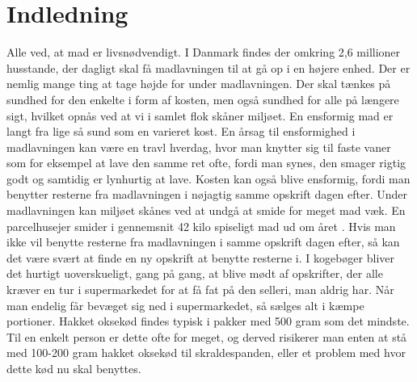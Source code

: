 \chapter{Indledning}
\label{chap:indledning}

Alle ved, at mad er livsnødvendigt. I Danmark findes der omkring 2,6 millioner husstande\cite{husstande}, der dagligt skal få madlavningen til at gå op i en højere enhed. Der er nemlig mange ting at tage højde for under madlavningen. Der skal tænkes på sundhed for den enkelte i form af kosten, men også sundhed for alle på længere sigt, hvilket opnås ved at vi i samlet flok skåner miljøet.
En ensformig mad er langt fra lige så sund som en varieret kost. En årsag til ensformighed i madlavningen kan være en travl hverdag, hvor man knytter sig til faste vaner som for eksempel at lave den samme ret ofte, fordi man synes, den smager rigtig godt og samtidig er lynhurtig at lave. Kosten kan også blive ensformig, fordi man benytter resterne fra madlavningen i nøjagtig samme opskrift dagen efter.
Under madlavningen kan miljøet skånes ved at undgå at smide for meget mad væk. En parcelhusejer smider i gennemsnit 42 kilo spiseligt mad ud om året \cite{madspildpol}. Hvis man ikke vil benytte resterne fra madlavningen i samme opskrift dagen efter, så kan det være svært at finde en ny opskrift at benytte resterne i. I kogebøger bliver det hurtigt uoverskueligt, gang på gang, at blive mødt af opskrifter, der alle kræver en tur i supermarkedet for at få fat på den selleri, man aldrig har. Når man endelig får bevæget sig ned i supermarkedet, så sælges alt i kæmpe portioner. Hakket oksekød findes typisk i pakker med 500 gram som det mindste. Til en enkelt person er dette ofte for meget, og derved risikerer man enten at stå med 100-200 gram hakket oksekød til skraldespanden, eller et problem med hvor dette kød nu skal benyttes.


